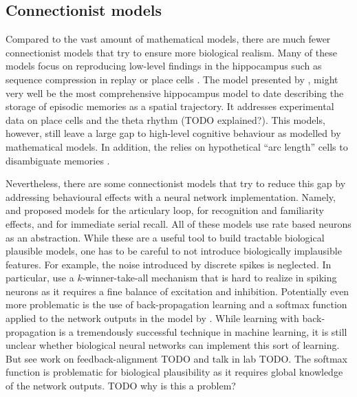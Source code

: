 \subsection{Connectionist models}
Compared to the vast amount of mathematical models, there are much fewer connectionist models that try to ensure more biological realism.
Many of these models focus on reproducing low-level findings in the hippocampus such as sequence compression in replay \parencite{Levy2005} or place cells \parencite{Milford2004}.
The model presented by \textcite{Hasselmo2012}, might very well be the most comprehensive hippocampus model to date describing the storage of episodic memories as a spatial trajectory.
It addresses experimental data on place cells and the theta rhythm (TODO explained?).
This models, however, still leave a large gap to high-level cognitive behaviour as modelled by mathematical models.
In addition, the \textcite{Hasselmo2012} relies on hypothetical ``arc length'' cells to disambiguate memories \parencite[cp.][]{Robins2014}.

Nevertheless, there are some connectionist models that try to reduce this gap by addressing behavioural effects with a neural network implementation.
Namely, \textcite{Burgess1992} and \textcite{Burgess1996} proposed models for the articulary loop, \textcite{Norman2003} for recognition and familiarity effects, and \textcite{Botvinick2006} for immediate serial recall.
All of these models use rate based neurons as an abstraction.
While these are a useful tool to build tractable biological plausible models, one has to be careful to not introduce biologically implausible features.
For example, the noise introduced by discrete spikes is neglected.
In particular, \textcite{Norman2003} use a $k$-winner-take-all mechanism that is hard to realize in spiking neurons as it requires a fine balance of excitation and inhibition.
Potentially even more problematic is the use of back-propagation learning and a softmax function applied to the network outputs in the model by \textcite{Botvinick2006}.
While learning with back-propagation is a tremendously successful technique in machine learning, it is still unclear whether biological neural networks can implement this sort of learning.
But see work on feedback-alignment TODO and talk in lab TODO\@.
The softmax function is problematic for biological plausibility as it requires global knowledge of the network outputs.
TODO why is this a problem?

